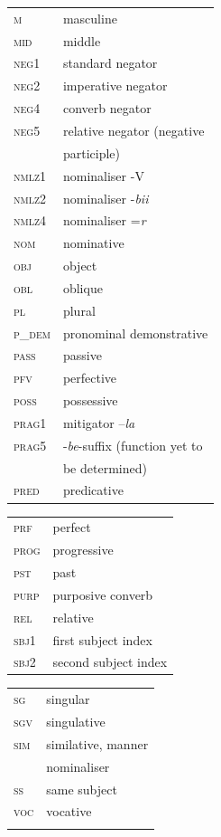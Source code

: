 \documentclass[output=paper,colorlinks,citecolor=brown,]{langscibook}
\begin{document}
\begin{tabularx}{.5\textwidth}{@{}lQ@{}}
\textsc{m} &  masculine\\
\textsc{mid} &  middle\\
\textsc{neg1} &  standard negator\\
\textsc{neg2} &  imperative negator\\
\textsc{neg4} &  converb negator\\
\textsc{neg5} &  relative negator (negative\\ &  participle)\\
\textsc{nmlz1} &  nominaliser -V\\
\textsc{nmlz2} &  nominaliser -\textit{bii}\\
\textsc{nmlz4} &  nominaliser =\textit{r}\\
\textsc{nom} &  nominative\\
\textsc{obj} &  object\\
\textsc{obl} &  oblique\\
\textsc{pl} &  plural\\
\textsc{p\_dem} &  pronominal demonstrative\\
\textsc{pass} &  passive\\
\textsc{pfv} &  perfective\\
\textsc{poss} &  possessive\\
\textsc{prag1} &  mitigator –\textit{la}\\
\textsc{prag5} &  -\textit{be}-suffix (function yet to\\ &  be determined)\\
\textsc{pred} &  predicative\end{tabularx}

\begin{tabularx}{.5\textwidth}{@{}lQ@{}}
\textsc{prf} &  perfect\\
\textsc{prog} &  progressive\\
\textsc{pst} &  past\\
\textsc{purp} &  purposive converb\\
\textsc{rel} &  relative\\
\textsc{sbj1} &  first subject index\\
\textsc{sbj2} &  second subject index\end{tabularx}
\begin{tabularx}{.5\textwidth}{@{}lQ@{}}
\textsc{sg} &  singular\\
\textsc{sgv} &  singulative\\
\textsc{sim} &  similative, manner \\ &  nominaliser\\
\textsc{ss} &  same subject\\
\textsc{voc} &  vocative\\\\\end{tabularx}
\end{document}
